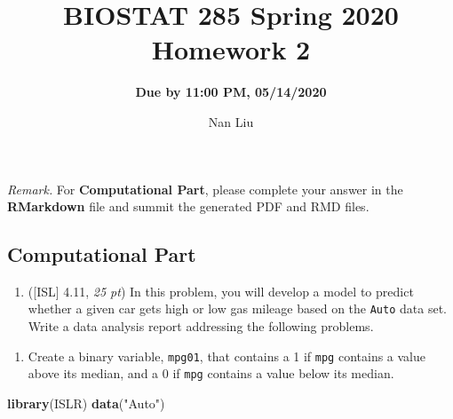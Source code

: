 \documentclass[]{article}
\title{\textbf {BIOSTAT 285 Spring 2020 Homework 2}}
\subtitle{\textbf{Due by 11:00 PM, 05/14/2020}}
\author{Nan Liu}
\date{}
\newenvironment{Shaded}{\begin{snugshade}}{\end{snugshade}}
\newcommand{\DataTypeTok}[1]{\textcolor[rgb]{0.13,0.29,0.53}{#1}}
\newcommand{\DecValTok}[1]{\textcolor[rgb]{0.00,0.00,0.81}{#1}}
\newcommand{\KeywordTok}[1]{\textcolor[rgb]{0.13,0.29,0.53}{\textbf{#1}}}
\newcommand{\NormalTok}[1]{#1}
\newcommand{\OperatorTok}[1]{\textcolor[rgb]{0.81,0.36,0.00}{\textbf{#1}}}
\newcommand{\StringTok}[1]{\textcolor[rgb]{0.31,0.60,0.02}{#1}}
\providecommand{\tightlist}{%
  \setlength{\itemsep}{0pt}\setlength{\parskip}{0pt}}
\begin{document}
\maketitle

\theoremstyle{definition}
\newtheorem*{hint}{Hint}

\theoremstyle{remark}
\newtheorem*{rmk}{Remark}

\emph{Remark.} For \textbf{Computational Part}, please complete your
answer in the \textbf{RMarkdown} file and summit the generated PDF and
RMD files.

\hypertarget{computational-part}{%
\subsection{Computational Part}\label{computational-part}}

\begin{enumerate}
\def\labelenumi{\arabic{enumi}.}
\tightlist
\item
  ({[}ISL{]} 4.11, \emph{25 pt}) In this problem, you will develop a
  model to predict whether a given car gets high or low gas mileage
  based on the \texttt{Auto} data set. Write a data analysis report
  addressing the following problems.
\end{enumerate}

\begin{enumerate}
\def\labelenumi{(\alph{enumi})}
\tightlist
\item
  Create a binary variable, \texttt{mpg01}, that contains a 1 if
  \texttt{mpg} contains a value above its median, and a 0 if
  \texttt{mpg} contains a value below its median.
\end{enumerate}

\begin{Shaded}
\begin{Highlighting}[]
\KeywordTok{library}\NormalTok{(ISLR) }
\KeywordTok{data}\NormalTok{(}\StringTok{"Auto"}\NormalTok{) }
\end{Highlighting}
\end{Shaded}

\begin{Shaded}
\end{Shaded}
\end{document}
